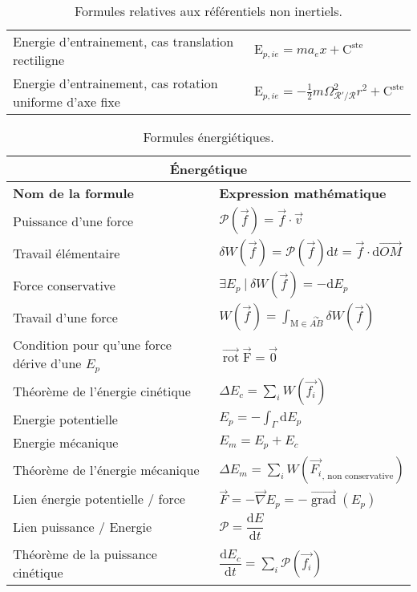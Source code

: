 \documentclass[10pt,a4paper,titlepage,portrait]{article}
\renewcommand{\d}
{
    \mathrm{d}
}
\newcommand{\constant}
{
    \mathrm{C}^{\text{ste}}
}
\newcommand*{\dv}[2]
{
    \dfrac{\d#1}{\d#2}
}
\newcommand{\rot}
{
    \vec{\operatorname{rot}}
}
\newcommand{\grad}
{
    \vec{\operatorname{grad}}
}
\renewcommand{\arraystretch}{2}
\begin{document}
\begin{center}
\begin{table}[ht]
\begin{tabular}{@{}p{9cm}p{10cm}@{}}
        Energie d'entrainement, cas translation rectiligne & $\mathrm{E}_{p,ie} = ma_ex + \constant$ \\ 
        Energie d'entrainement, cas rotation uniforme d'axe fixe & $\mathrm{E}_{p,ie} = -\frac{1}{2}m\Omega^{2}_{\mathcal{R}'/\mathcal{R}}r^2+\constant$ \\ 
        \bottomrule
    \end{tabular}
    \caption{Formules relatives aux référentiels non inertiels.}
    \label{tab:ref_non_inertiel}
\end{table}


\begin{table}[ht]
    \centering
    \renewcommand{\arraystretch}{1.5} %
    \setlength{\tabcolsep}{8pt} %
    \begin{tabular}{@{}p{9cm}p{10cm}@{}}
        \toprule
        \multicolumn{2}{c}{\textbf{Énergétique}} \\
        \midrule
        \textbf{Nom de la formule} & \textbf{Expression mathématique} \\
        \midrule
    Puissance d'une force & $\mathcal{P}(\vec{f}) = \vec{f} \cdot \vec{v}$ \\ 
    Travail élémentaire & $\delta W(\vec{f}) = \mathcal{P}(\vec{f})\text{d}t=\vec{f}\cdot \text{d}\vec{OM}$ \\ 
    Force conservative & $\exists E_{p} \ | \ \delta W(\vec{f}) = -\text{d}E_{p}$ \\ 
    Travail d'une force & $\displaystyle W(\vec{f}) = \int_{\text{M}\in\overset{\curvearrowright}{AB}}\delta W(\vec{f})$ \\ 
    Condition pour qu'une force dérive d'une $E_p$ & $\rot{\vec{\text{F}}} = \vec{0}$ \\ 
    Théorème de l'énergie cinétique & $\displaystyle \Delta E_c = \sum\limits_{i}W(\vec{f_i})$ \\ 
    Energie potentielle & $\displaystyle E_p = -\int_{\Gamma}\text{d}E_p$ \\ 
    Energie mécanique & $E_m = E_p + E_c$ \\ 
    Théorème de l'énergie mécanique & $\displaystyle \Delta E_m = \sum_{i}W(\vec{F_i}_{\text{, non conservative}})$ \\ 
    Lien énergie potentielle / force & $\vec{F} = -\vec{\nabla} E_p = -\grad(E_p)$ \\ 
    Lien puissance / Energie & $\mathcal{P} = \dv{E}{t}$ \\ 
    Théorème de la puissance cinétique & $\displaystyle \dv{E_c}{t} = \sum_{i}\mathcal{P}(\vec{f_i})$ \\ 
    \bottomrule
\end{tabular}
\caption{Formules énergiétiques.}
\label{tab:energetique}
\end{table}



\end{center}
\end{document}
